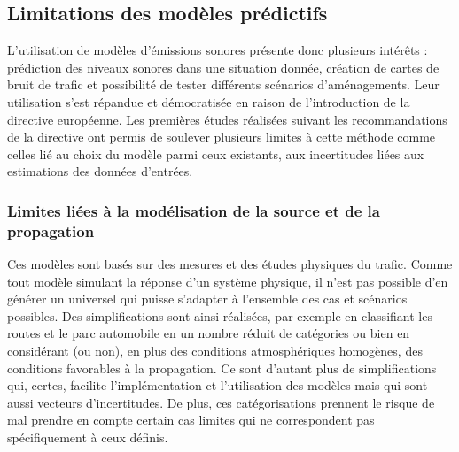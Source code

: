 \subsection{Limitations des modèles prédictifs}

L'utilisation de modèles d'émissions sonores présente donc plusieurs intérêts : prédiction des niveaux sonores dans une situation donnée, création de cartes de bruit de trafic et possibilité de tester différents scénarios d'aménagements. Leur utilisation s'est répandue et démocratisée en raison de l'introduction de la directive européenne. Les premières études réalisées suivant les recommandations de la directive ont permis de soulever plusieurs limites à cette méthode comme celles lié au choix du modèle parmi ceux existants, aux incertitudes liées aux estimations des données d'entrées.

\subsubsection{Limites liées à la modélisation de la source et de la propagation}

Ces modèles sont basés sur des mesures et des études physiques du trafic. Comme tout modèle simulant la réponse d'un système physique, il n'est pas possible d'en générer un universel qui puisse s'adapter à l'ensemble des cas et scénarios possibles. Des simplifications sont ainsi réalisées, par exemple en classifiant les routes et le parc automobile en un nombre réduit de catégories ou bien en considérant (ou non), en plus des conditions atmosphériques homogènes, des conditions favorables à la propagation. Ce sont d'autant plus de simplifications qui, certes, facilite l'implémentation et l'utilisation des modèles mais qui sont aussi vecteurs d'incertitudes. De plus, ces catégorisations prennent le risque de mal prendre en compte certain cas limites qui ne correspondent pas spécifiquement à ceux définis.

